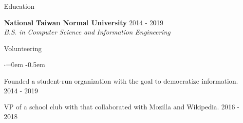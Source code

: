 \documentclass{resume} %
\begin{document}

\begin{rSection}{Education}

{\bf National Taiwan Normal University} \hfill {2014 - 2019} \\
{\em B.S. in Computer Science and Information Engineering}

\end{rSection}

\begin{rSection}{Volunteering}

\begin{list}{$\cdot$}{\leftmargin=0em}
\itemsep -0.5em
\item Founded a student-run organization with the goal to democratize information. \hfill {2014 - 2019}
\item VP of a school club with that collaborated with Mozilla and Wikipedia. \hfill {2016 - 2018}
\end{list}

\end{rSection}

\end{document}
